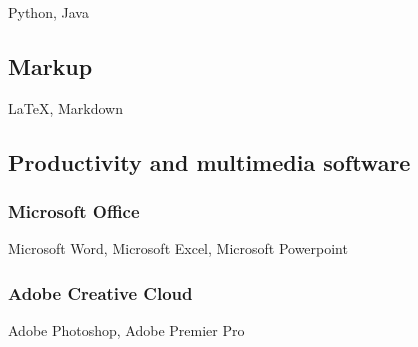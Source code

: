 \documentclass{article}
\begin{document}
Python, Java

\subsection{Markup}

\LaTeX , Markdown

\subsection{Productivity and multimedia software}

\subsubsection{Microsoft Office}
Microsoft Word, Microsoft Excel, Microsoft Powerpoint

\subsubsection{Adobe Creative Cloud}
Adobe Photoshop, Adobe Premier Pro
\end{document}

